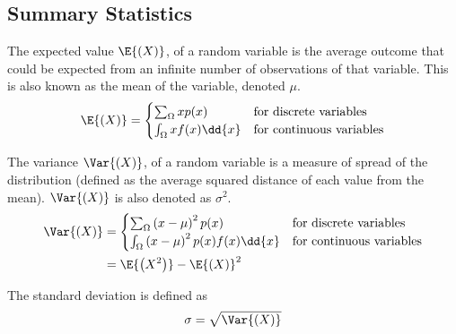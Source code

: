 \documentclass{article}
\begin{document}
\subsection{Summary Statistics}
\begin{definition}[Expectation]
    The expected value $\E{\left( X \right)}$, of a random variable is the average
    outcome that could be expected from an infinite number of observations of that
    variable. This is also known as the mean of the variable, denoted $\mu$.
    \begin{equation*}
        \E{\left( X \right)} =
        \begin{cases}
            \sum_{\Omega} x p(x)        & \text{for discrete variables}   \\
            \int_{\Omega} x f(x) \dd{x} & \text{for continuous variables}
        \end{cases}
    \end{equation*}
\end{definition}
\begin{definition}[Variance]
    The variance $\Var{\left( X \right)}$, of a random variable is a measure of spread
    of the distribution (defined as the average squared distance of each value from the mean).
    $\Var{\left( X \right)}$ is also denoted as $\sigma^2$.
    \begin{align*}
        \Var{\left( X \right)} & =
        \begin{cases}
            \sum_{\Omega} \left( x - \mu \right)^2 p(x)             & \text{for discrete variables}   \\
            \int_{\Omega} \left( x - \mu \right)^2 p(x) f(x) \dd{x} & \text{for continuous variables}
        \end{cases} \\
                               & = \E{\left( X^2 \right)} - \E{\left( X \right)}^2
    \end{align*}
\end{definition}
\begin{definition}
    The standard deviation is defined as
    \begin{equation*}
        \sigma = \sqrt{\Var{\left( X \right)}}
    \end{equation*}
\end{definition}
\end{document}
